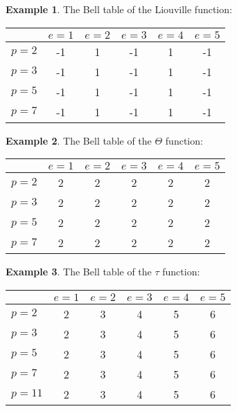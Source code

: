\documentclass[a4paper]{article}
\theoremstyle{definition}
\newtheorem{example}{Example}[section]
\theoremstyle{remark}
\begin{document}
\begin{example}
The Bell table of the Liouville function:
\vskip10pt
\begin{center}
\begin{tabular}{| l | | c | c | c | c | c |}
\hline
& $e = 1$ & $e = 2$ & $e = 3$ & $e = 4$ & $e = 5$\\
\hline
\hline
$p = 2$ & -1 & 1 & -1 & 1 & -1 \\
\hline
$p = 3$ & -1 & 1 & -1 & 1 & -1 \\
\hline
$p = 5$ & -1 & 1 & -1 & 1 & -1 \\
\hline
$p = 7$ & -1 & 1 & -1 & 1 & -1 \\
\hline
\end{tabular}
\end{center}
\end{example}

\begin{example}
The Bell table of the $\Theta$ function:
\vskip10pt
\begin{center}
\begin{tabular}{| l | | c | c | c | c | c |}
\hline
& $e = 1$ & $e = 2$ & $e = 3$ & $e = 4$ & $e = 5$\\
\hline
\hline
$p = 2$ & 2 & 2 & 2 & 2 & 2 \\
\hline
$p = 3$ & 2 & 2 & 2 & 2 & 2 \\
\hline
$p = 5$ & 2 & 2 & 2 & 2 & 2 \\
\hline
$p = 7$ & 2 & 2 & 2 & 2 & 2 \\
\hline
\end{tabular}
\end{center}
\end{example}

\begin{example}
The Bell table of the $\tau$ function:
\vskip10pt
\begin{center}
\begin{tabular}{| l | | c | c | c | c | c |}
\hline
& $e = 1$ & $e = 2$ & $e = 3$ & $e = 4$ & $e = 5$\\
\hline
\hline
$p = 2$ & 2 & 3 & 4 & 5 & 6 \\
\hline
$p = 3$ & 2 & 3 & 4 & 5 & 6 \\
\hline
$p = 5$ & 2 & 3 & 4 & 5 & 6 \\
\hline
$p = 7$ & 2 & 3 & 4 & 5 & 6 \\
\hline
$p = 11$ & 2 & 3 & 4 & 5 & 6 \\
\hline
\end{tabular}
\end{center}
\end{example}
\end{document}
